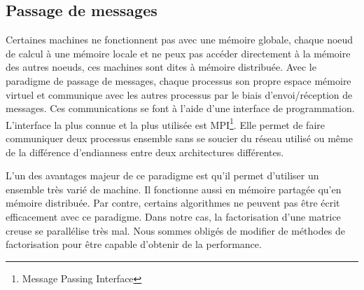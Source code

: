 \subsection{Passage de messages}
Certaines machines ne fonctionnent pas avec une mémoire globale, chaque noeud de calcul à une mémoire locale et ne peux pas accéder directement à la mémoire des autres noeuds, ces machines sont dites à mémoire distribuée.
%
Avec le paradigme de passage de messages, chaque processus son propre espace mémoire virtuel et communique avec les autres processus par le biais d'envoi/réception de messages.
%
Ces communications se font à l'aide d'une interface de programmation.
%
L'interface la plus connue et la plus utilisée est MPI\footnote{Message Passing Interface}.
%
Elle permet de faire communiquer deux processus ensemble sans se soucier du réseau utilisé ou même de la différence d'endianness entre deux architectures différentes.


L'un des avantages majeur de ce paradigme est qu'il permet d'utiliser un ensemble très varié de machine.
%
Il fonctionne aussi en mémoire partagée qu'en mémoire distribuée.
%
Par contre, certains algorithmes ne peuvent pas être écrit efficacement avec ce paradigme.
%
Dans notre cas, la factorisation d'une matrice creuse se parallélise très mal.
%
Nous sommes obligés de modifier de méthodes de factorisation pour être capable d'obtenir de la performance.
